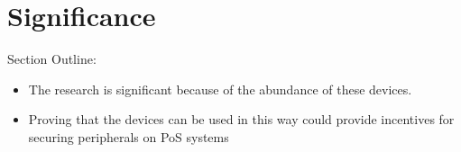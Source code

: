 \chapter*{Significance}
\label{chap:significance}

Section Outline:
\begin{itemize}
  \item The research is significant because of the abundance of these devices.
  \item Proving that the devices can be used in this way could provide incentives for securing peripherals on PoS systems
\end{itemize}
